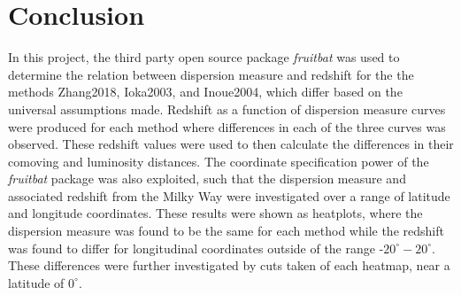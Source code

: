 \documentclass{article}
\begin{document}
\section{Conclusion}

In this project, the third party open source package \emph{fruitbat} was used to determine the relation between dispersion measure and redshift for the the methods Zhang2018, Ioka2003, and Inoue2004, which differ based on the universal assumptions made. Redshift as a function of dispersion measure curves were produced for each method where differences in each of the three curves was observed. These redshift values were used to then calculate the differences in their comoving and luminosity distances. The coordinate specification power of the \emph{fruitbat} package was also exploited, such that the dispersion measure and associated redshift from the Milky Way were investigated over a range of latitude and longitude coordinates. These results were shown as heatplots, where the dispersion measure was found to be the same for each method while the redshift was found to differ for longitudinal coordinates outside of the range -$20^\circ-20^\circ$. These differences were further investigated by cuts taken of each heatmap, near a latitude of $0^\circ$.



\end{document}
